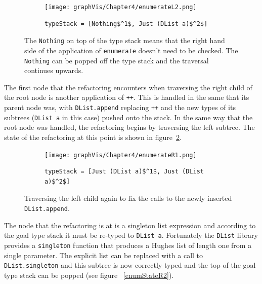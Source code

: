 \begin{figure}[t]
	\begin{subfigure}{\linewidth}
		\texttt{[image: graphVis/Chapter4/enumerateL2.png]}
	\end{subfigure}\par\medskip

	\begin{subfigure}{\linewidth}
		\begin{lstlisting}[mathescape]
			typeStack = [Nothing$^1$, Just (DList a)$^2$]
		\end{lstlisting}
	\end{subfigure}\par\medskip
\caption{The \texttt{Nothing} on top of the type stack means that the right hand side of the application of \texttt{enumerate} doesn't need to be checked. The \texttt{Nothing} can be popped off the type stack and the traversal continues upwards.}
\label{enumStateL2}
\end{figure}

The first node that the refactoring encounters when traversing the right child of the root node is another application of \texttt{++}. This is handled in the same that its parent node was, with \texttt{DList.append} replacing \texttt{++} and the new types of its subtrees (\texttt{DList a} in this case) pushed onto the stack. In the same way that the root node was handled, the refactoring begins by traversing the left subtree. The state of the refactoring at this point is shown in figure~\ref{enumStateR1}.

\begin{figure}[t]
	\begin{subfigure}{\linewidth}
		\texttt{[image: graphVis/Chapter4/enumerateR1.png]}
	\end{subfigure}\par\medskip

	\begin{subfigure}{\linewidth}
		\begin{lstlisting}[mathescape]
			typeStack = [Just (DList a)$^1$, Just (DList a)$^2$]
		\end{lstlisting}
	\end{subfigure}\par\medskip
\caption{Traversing the left child again to fix the calls to the newly inserted \texttt{DList.append}.}
\label{enumStateR1}
\end{figure}

The node that the refactoring is at is a singleton list expression and according to the goal type stack it must be re-typed to \texttt{DList a}. Fortunately the \texttt{DList} library provides a \texttt{singleton} function that produces a Hughes list of length one from a single parameter. The explicit list can be replaced with a call to \texttt{DList.singleton} and this subtree is now correctly typed and the top of the goal type stack can be popped (see figure ~\ref{enumStateR2}).


